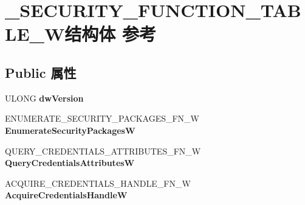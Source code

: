\hypertarget{struct___s_e_c_u_r_i_t_y___f_u_n_c_t_i_o_n___t_a_b_l_e___w}{}\section{\+\_\+\+S\+E\+C\+U\+R\+I\+T\+Y\+\_\+\+F\+U\+N\+C\+T\+I\+O\+N\+\_\+\+T\+A\+B\+L\+E\+\_\+\+W结构体 参考}
\label{struct___s_e_c_u_r_i_t_y___f_u_n_c_t_i_o_n___t_a_b_l_e___w}
\subsection*{Public 属性}
\begin{DoxyCompactItemize}
\item 
\mbox{\label{struct___s_e_c_u_r_i_t_y___f_u_n_c_t_i_o_n___t_a_b_l_e___w_aacdba512923e5580ecf67679263c1a73}} 
U\+L\+O\+NG {\bfseries dw\+Version}
\item 
\mbox{\label{struct___s_e_c_u_r_i_t_y___f_u_n_c_t_i_o_n___t_a_b_l_e___w_aa919bdd6e72409e034e6436a1969768b}} 
E\+N\+U\+M\+E\+R\+A\+T\+E\+\_\+\+S\+E\+C\+U\+R\+I\+T\+Y\+\_\+\+P\+A\+C\+K\+A\+G\+E\+S\+\_\+\+F\+N\+\_\+W {\bfseries Enumerate\+Security\+PackagesW}
\item 
\mbox{\label{struct___s_e_c_u_r_i_t_y___f_u_n_c_t_i_o_n___t_a_b_l_e___w_ade3bdb25371076ef528007f0f7a88e37}} 
Q\+U\+E\+R\+Y\+\_\+\+C\+R\+E\+D\+E\+N\+T\+I\+A\+L\+S\+\_\+\+A\+T\+T\+R\+I\+B\+U\+T\+E\+S\+\_\+\+F\+N\+\_\+W {\bfseries Query\+Credentials\+AttributesW}
\item 
\mbox{\label{struct___s_e_c_u_r_i_t_y___f_u_n_c_t_i_o_n___t_a_b_l_e___w_aa072cebdc7a86a9c3f9170c08c85caf1}} 
A\+C\+Q\+U\+I\+R\+E\+\_\+\+C\+R\+E\+D\+E\+N\+T\+I\+A\+L\+S\+\_\+\+H\+A\+N\+D\+L\+E\+\_\+\+F\+N\+\_\+W {\bfseries Acquire\+Credentials\+HandleW}
\item 
\mbox{\label{struct___s_e_c_u_r_i_t_y___f_u_n_c_t_i_o_n___t_a_b_l_e___w_aac8060ef4eeda4923a21c3cd04404f8e}} 

\end{DoxyCompactItemize}
